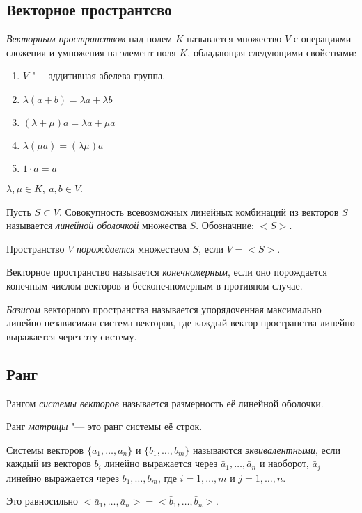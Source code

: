 \subsection*{Векторное пространтсво}

\begin{definition}
    \textit{Векторным пространством} над полем $K$ называется множество $V$ с операциями сложения и умножения на элемент поля $K$, обладающая следующими свойствами:
    \begin{enumerate}
        \item $V$ "--- аддитивная абелева группа.
        \item $\lambda(a + b) = \lambda a + \lambda b$
        \item $(\lambda + \mu)a = \lambda a + \mu a$
        \item $\lambda(\mu a) = (\lambda \mu)a$
        \item $1 \cdot a = a$
    \end{enumerate}
    $\lambda,\mu \in K,~a,b \in V$.
\end{definition}

\begin{definition}
    Пусть $S \subset V$. Совокупность всевозможных линейных комбинаций из векторов $S$ называется \textit{линейной оболочкой} множества $S$. Обозначние: $<\!S\!>$.
\end{definition}
Пространство $V$ \textit{порождается} множеством $S$, если $V = <\!S\!>$.

\begin{definition}
    Векторное пространство называется \textit{конечномерным}, если оно порождается конечным числом векторов и бесконечномерным в противном случае.
\end{definition}
\begin{definition}
    \textit{Базисом} векторного пространства называется упорядоченная максимально линейно независимая система векторов, где каждый вектор пространства линейно выражается через эту систему.    
\end{definition}

\subsection*{Ранг}
\begin{definition}
    Рангом \textit{системы векторов} называется размерность её линейной оболочки.

    Ранг \textit{матрицы} "--- это ранг системы её строк.
\end{definition}
\begin{definition}
    Системы векторов $\{\bar{a}_1, \ldots, \bar{a}_n\}$ и $\{\bar{b}_1, \ldots, \bar{b}_m\}$ называются \textit{эквивалентными}, если каждый из векторов $\bar{b}_i$ линейно выражается через $\bar{a}_1, \ldots, \bar{a}_n$ и наоборот,
    $\bar{a}_j$ линейно выражается через $\bar{b}_1, \ldots, \bar{b}_m$, где $i = 1,\ldots,m$ и $j = 1,\ldots, n$.

    Это равносильно $<\!\bar{a}_1, \ldots, \bar{a}_n\!> = <\!\bar{b}_1, \ldots, \bar{b}_n\!>$.
\end{definition}


